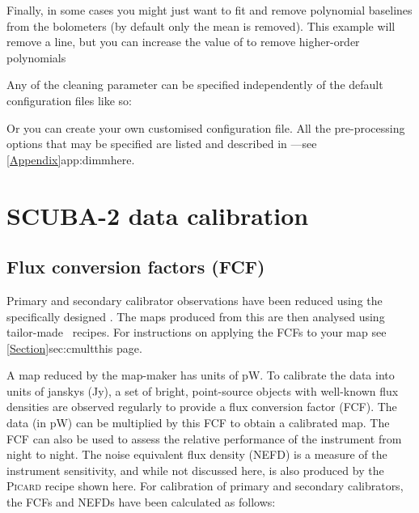 \documentclass[11pt,oneside,chapters]{starlink}
\begin{document}
Finally, in some cases you might just want to fit and remove
polynomial baselines from the bolometers (by default only the mean is
removed). This example will remove a line, but you can increase the
value of  to remove higher-order polynomials


Any of the cleaning parameter can be specified independently of the
default configuration files like so:
\begin{terminalv}
\end{terminalv}
Or you can create your own customised configuration file. All the
pre-processing options that may be specified are listed and described
in ---see \cref{Appendix}{app:dimm}{here}.


\newpage
\chapter{SCUBA-2 data calibration}
\label{app:cal}

\section{Flux conversion factors (FCF)}
\label{app:fcf}

Primary and secondary calibrator observations have been reduced using
the specifically designed .
The maps produced from this are then analysed using tailor-made
\picard\ recipes. For instructions on applying the FCFs to your map see
\cref{Section}{sec:cmult}{this page}.

A map reduced by the map-maker has units of pW. To calibrate the data
into units of janskys (Jy), a set of bright, point-source objects with
well-known flux densities are observed regularly to provide a flux
conversion factor (FCF). The data (in pW) can be multiplied by this FCF
to obtain a calibrated map. The FCF can also be used to assess the
relative performance of the instrument from night to night. The noise
equivalent flux density (NEFD) is a measure of the instrument
sensitivity, and while not discussed here, is also produced by the
\textsc{Picard} recipe shown here. For calibration of primary and secondary
calibrators, the FCFs and NEFDs have been calculated as follows:
\end{document}
